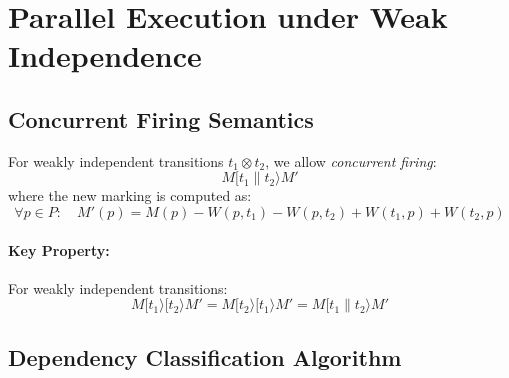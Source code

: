 
\section{Parallel Execution under Weak Independence}
\label{sec:parallel-execution}

\subsection{Concurrent Firing Semantics}
\label{subsec:concurrent-firing}

For weakly independent transitions $t_1 \otimes t_2$, we allow \emph{concurrent firing}:
%
\begin{equation}
M[t_1 \parallel t_2\rangle M'
\end{equation}
%
where the new marking is computed as:
%
\begin{equation}
\forall p \in P: \quad M'(p) = M(p) - W(p,t_1) - W(p,t_2) + W(t_1,p) + W(t_2,p)
\label{eq:concurrent-firing}
\end{equation}

\paragraph{Key Property:} For weakly independent transitions:
\begin{equation}
M[t_1\rangle[t_2\rangle M' = M[t_2\rangle[t_1\rangle M' = M[t_1 \parallel t_2\rangle M'
\end{equation}

\subsection{Dependency Classification Algorithm}
\label{subsec:dependency-algorithm}


